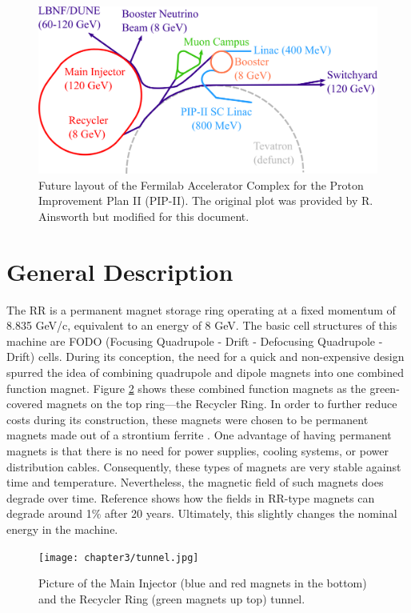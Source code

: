 \begin{figure}[H]
   \centering
   \includegraphics[width=\columnwidth]{chapter3/complexPIPII.png}
   \caption{Future layout of the Fermilab Accelerator Complex for the Proton Improvement Plan II (PIP-II). The original plot was provided by R. Ainsworth but modified for this document.}
   \label{fig:fnalpip2}
   \vspace{-1.25em}
\end{figure}

\section{\label{sec:rrgen}General Description}

The RR is a permanent magnet storage ring operating at a fixed momentum of 8.835 GeV/c, equivalent to an energy of 8 GeV. The basic cell structures of this machine are FODO (Focusing Quadrupole - Drift - Defocusing Quadrupole - Drift) cells. During its conception, the need for a quick and non-expensive design spurred the idea of combining quadrupole and dipole magnets into one combined function magnet. Figure \ref{fig:rrtunnel} shows these combined function magnets as the green-covered magnets on the top ring---the Recycler Ring. In order to further reduce costs during its construction, these magnets were chosen to be permanent magnets made out of a strontium ferrite \cite{rr0}. One advantage of having permanent magnets is that there is no need for power supplies, cooling systems, or power distribution cables. Consequently, these types of magnets are very stable against time and temperature. Nevertheless, the magnetic field of such magnets does degrade over time. Reference \cite{rr1} shows how the fields in RR-type magnets can degrade around 1\% after 20 years. Ultimately, this slightly changes the nominal energy in the machine. 

\begin{figure}[H]
   \centering
   \texttt{[image: chapter3/tunnel.jpg]}
   \caption{Picture of the Main Injector (blue and red magnets in the bottom) and the Recycler Ring (green magnets up top) tunnel.}
   \label{fig:rrtunnel}
   \vspace{-1.25em}
\end{figure}

